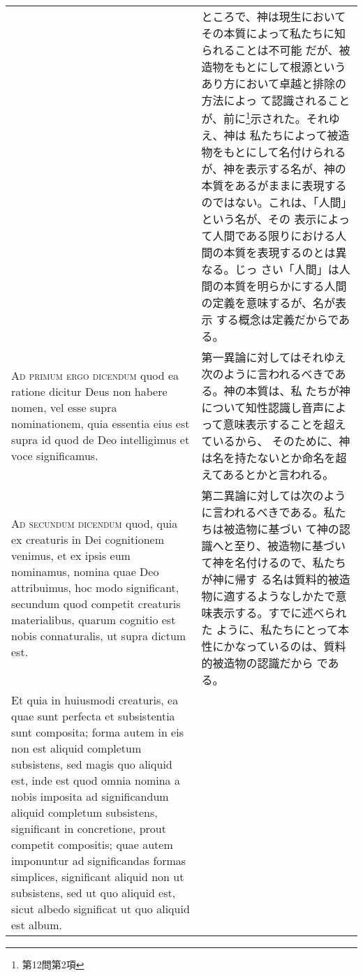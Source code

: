 \documentclass[paper=a4paper,fontsize=10pt,jafontsize=9pt,titlepage]{jlreq}
\begin{document}
\begin{longtable}{p{21em}p{21em}}
&

ところで、神は現生においてその本質によって私たちに知られることは不可能
だが、被造物をもとにして根源というあり方において卓越と排除の方法によっ
て認識されることが、前に\footnote{第12問第2項}示された。それゆえ、神は
私たちによって被造物をもとにして名付けられるが、神を表示する名が、神の
本質をあるがままに表現するのではない。これは、「人間」という名が、その
表示によって人間である限りにおける人間の本質を表現するのとは異なる。じっ
さい「人間」は人間の本質を明らかにする人間の定義を意味するが、名が表示
する概念は定義だからである。

\\

{\scshape Ad primum ergo dicendum} quod ea ratione dicitur Deus non habere
nomen, vel esse supra nominationem, quia essentia eius est supra id
quod de Deo intelligimus et voce significamus.

&

第一異論に対してはそれゆえ次のように言われるべきである。神の本質は、私
たちが神について知性認識し音声によって意味表示することを超えているから、
そのために、神は名を持たないとか命名を超えてあるとかと言われる。

\\

{\scshape Ad secundum dicendum} quod, quia ex creaturis in Dei cognitionem
venimus, et ex ipsis eum nominamus, nomina quae Deo attribuimus, hoc
modo significant, secundum quod competit creaturis materialibus, quarum
cognitio est nobis connaturalis, ut supra dictum est. 

&

第二異論に対しては次のように言われるべきである。私たちは被造物に基づい
て神の認識へと至り、被造物に基づいて神を名付けるので、私たちが神に帰す
る名は質料的被造物に適するようなしかたで意味表示する。すでに述べられた
ように、私たちにとって本性にかなっているのは、質料的被造物の認識だから
である。

\\

Et quia in huiusmodi creaturis, ea quae sunt perfecta et subsistentia
sunt composita; forma autem in eis non est aliquid completum
subsistens, sed magis quo aliquid est, inde est quod omnia nomina a
nobis imposita ad significandum aliquid completum subsistens,
significant in concretione, prout competit compositis; quae autem
imponuntur ad significandas formas simplices, significant aliquid non
ut subsistens, sed ut quo aliquid est, sicut albedo significat ut quo
aliquid est album.


\end{longtable}
\end{document}
